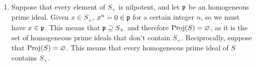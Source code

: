 \begin{sol}
	\begin{enumerate}[label=\alph*)]
		\item Suppose that every element of $S_+$ is nilpotent, and let $\mathfrak{p}$ be an homogeneous prime ideal. Given $x \in S_+$, $x^n = 0 \in \mathfrak{p}$ for a certain integer $n$, so we must have $x \in \mathfrak{p}$. This means that $\mathfrak{p} \supseteq S_+$ and therefore $\mathrm{Proj}(S) = \varnothing$, as it is the set of homogeneous prime ideals that don't contain $S_+$. Reciprocally, suppose that $\mathrm{Proj}(S) = \varnothing$. This means that every homogeneous prime ideal of $S$ contains $S_+$. 
	\end{enumerate}
\end{sol}